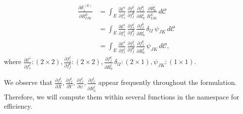 \documentclass[a4paper,12pt]{article}
\begin{document}
\begin{equation}
	\label{eqn:152}
	\begin{aligned}
	\frac{\partial \mathcal{S}_i^{(E)}}{\partial \dot{R_{IJK}^{E}}}
	&=\int_E\frac{\partial \mathcal{E}^i}{\partial f^j_s}\,\frac{\partial f^j_s}{\partial f^k_f}\,\frac{\partial f^k_f}{\partial \dot{R^l_0}}\,\frac{\partial \dot{R^l_0}}{\dot{R_{IJK}^{E}}}\,d\mathcal{C}\\
	&=\int_E\frac{\partial \mathcal{E}^i}{\partial f^j_s}\,\frac{\partial f^j_s}{\partial f^k_f}\,\frac{\partial f^k_f}{\partial \dot{R^l_0}}\,\delta_{lI}\,\psi_{JK}\,d\mathcal{C}\\
	&=\int_E\frac{\partial \mathcal{E}^i}{\partial f^j_s}\,\frac{\partial f^j_s}{\partial f^k_f}\,\frac{\partial f^k_f}{\partial \dot{R^I_0}}\,\psi_{JK}\,d\mathcal{C},
    \end{aligned}
\end{equation}
where $\frac{\partial \mathcal{E}^i}{\partial f^j_s}:(2\times2),\frac{\partial f^j_s}{\partial f^k_f}:(2\times2), \frac{\partial f^k_f}{\partial \dot{R^l_0}}\,\delta_{lI}:(2\times1), \psi_{JK}:(1\times 1)$.

We observe that $\frac{\partial f_{f}^i}{\partial \dot{X}}, \frac{\partial f_{f}^i}{\partial \dot{Y}}, \frac{\partial f_{f}^i}{\partial \dot{\psi}},\frac{\partial f^i_f}{\partial \dot{R^j_0}}$ appear frequently throughout the formulation. Therefore, we will compute them within several functions in the namespace for efficiency.
\end{document}
